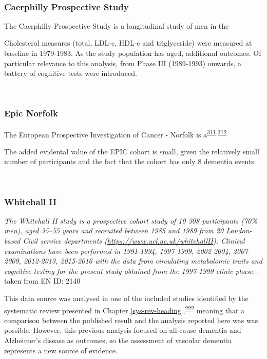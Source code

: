 \documentclass[a4paper, twoside]{templates/ociamthesis}
\begin{document}
~

\hypertarget{caerphilly-prospective-study}{%
\subsubsection{Caerphilly Prospective Study}\label{caerphilly-prospective-study}}

The Caerphilly Prospective Study is a longitudinal study of men in the

Cholesterol measures (total, LDL-c, HDL-c and triglyceride) were measured at baseline in 1979-1983.
As the study population has aged, additional outcomes. Of particular relevance to this analysis, from Phase III (1989-1993) onwards, a battery of cognitive tests were introduced.

~

\hypertarget{epic-norfolk}{%
\subsubsection{Epic Norfolk}\label{epic-norfolk}}

The European Prospective Investigation of Cancer - Norfolk is a\textsuperscript{\protect\hyperlink{ref-riboli1997}{311},\protect\hyperlink{ref-riboli2002}{312}}

The added evidental value of the EPIC cohort is small, given the relatively small number of participants and the fact that the cohort has only 8 dementia events.

~

\hypertarget{whitehall-ii}{%
\subsubsection{Whitehall II}\label{whitehall-ii}}

\emph{The Whitehall II study is a prospective cohort study of 10 308 participants (70\% men), aged 35--55 years and recruited between 1985 and 1989 from 20 London-based Civil service departments (\url{https://www.ucl.ac.uk/whitehallII}). Clinical examinations have been performed in 1991-1994, 1997-1999, 2002-2004, 2007-2009, 2012-2013, 2015-2016 with the data from circulating metabolomic traits and cognitive testing for the present study obtained from the 1997-1999 clinic phase.} - taken from EN ID: 2140

This data source was analysed in one of the included studies identified by the systematic review presented in Chapter \ref{sys-rev-heading},\textsuperscript{\protect\hyperlink{ref-tynkkynen2018}{222}} meaning that a comparison between the published result and the analysis reported here was was possible. However, this previous analysis focused on all-cause dementia and Alzheimer's disease as outcomes, so the assessment of vascular dementia represents a new source of evidence.
\end{document}
